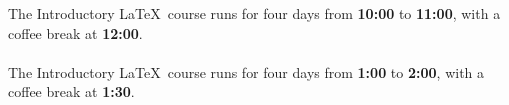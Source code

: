 \documentclass{article}
\begin{document}
\newcommand{\timeofday}[3]{
The Introductory \LaTeX \ course runs for four days from \textbf{#1} to \textbf{#2}, with a coffee break at \textbf{#3}.
\\\\}
\timeofday{10:00}{11:00}{12:00}
\timeofday{1:00}{2:00}{1:30}
\end{document}
